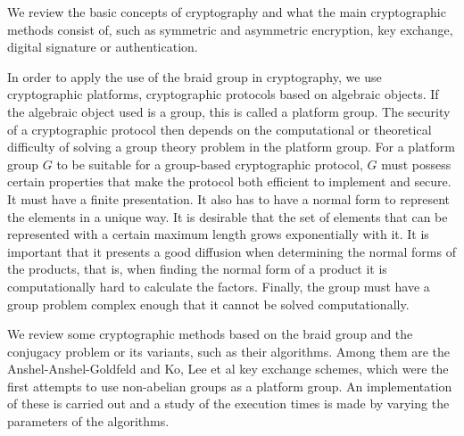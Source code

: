 \documentclass[12pt]{book}
\theoremstyle{definition}
\begin{document}
We review the basic concepts of cryptography and what the main cryptographic methods consist of, such as symmetric and asymmetric encryption, key exchange, digital signature or authentication.

In order to apply the use of the braid group in cryptography, we use cryptographic platforms, cryptographic protocols based on algebraic objects. If the algebraic object used is a group, this is called a platform group. The security of a cryptographic protocol then depends on the computational or theoretical difficulty of solving a group theory problem in the platform group. For a platform group $G$ to be suitable for a group-based cryptographic protocol, $G$ must possess certain properties that make the protocol both efficient to implement and secure. It must have a finite presentation. It also has to have a normal form to represent the elements in a unique way. It is desirable that the set of elements that can be represented with a certain maximum length grows exponentially with it. It is important that it presents a good diffusion when determining the normal forms of the products, that is, when finding the normal form of a product it is computationally hard to calculate the factors. Finally, the group must have a group problem complex enough that it cannot be solved computationally.

We review some cryptographic methods based on the braid group and the conjugacy problem or its variants, such as their algorithms. Among them are the Anshel-Anshel-Goldfeld and Ko, Lee et al key exchange schemes, which were the first attempts to use non-abelian groups as a platform group. An implementation of these is carried out and a study of the execution times is made by varying the parameters of the algorithms.
\end{document}
